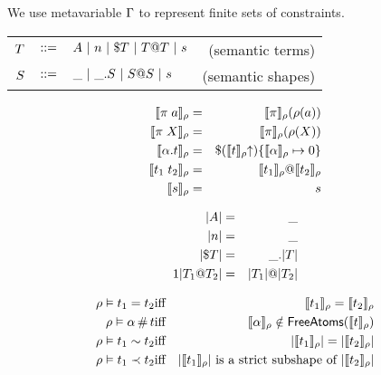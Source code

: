 \documentclass[english, mgr]{iithesis}
\begin{document}
We use metavariable $\Gamma$ to represent finite sets of constraints.


\begin{tabular}{rclr}
$T$ & $::=$ & $A
               \ |\  n
               \ |\  \$ T
               \ |\  T @ T
               \ |\  s$
    & (semantic terms) \\
$S$   & $::=$ & $\_
               \ |\  \_. S
               \ |\  S @ S
               \ |\  s$
    & (semantic shapes)
\end{tabular}

\begin{eqnarray*}
  \llbracket \pi \; a \rrbracket_{\rho} & = &
    \llbracket \pi \rrbracket_{\rho}(\rho(a)) \\
  \llbracket \pi \; X \rrbracket_{\rho} & = &
    \llbracket \pi \rrbracket_{\rho}(\rho(X)) \\
  \llbracket \alpha. t \rrbracket_{\rho} & = &
    \$ (\llbracket t \rrbracket_{\rho} \kern-3pt \uparrow)
      \{\llbracket \alpha \rrbracket_{\rho}\mapsto0\} \\
  \llbracket t_1 \; t_2 \rrbracket_{\rho} & = &
    \llbracket t_1 \rrbracket_{\rho} @ \llbracket t_2 \rrbracket_{\rho} \\
  \llbracket s \rrbracket_{\rho} & = & s
\end{eqnarray*}

\begin{eqnarray*}
  |A|                     & = & \_ \\
  |n|                            & = & \_ \\
  |\$ T|             & = & \_. |T| \\1
  |T_1 @ T_2| & = &
    |T_1| @ |T_2|
\end{eqnarray*}

\begin{eqnarray*}
  \rho \vDash t_1 = t_2 & \textrm{iff} &
    \llbracket t_1 \rrbracket_{\rho} = \llbracket t_2 \rrbracket_{\rho} \\
  \rho \vDash \alpha \,\#\, t & \textrm{iff} &
    \llbracket \alpha \rrbracket_{\rho} \notin
      \mathsf{FreeAtoms}(\llbracket t \rrbracket_{\rho}) \\
  \rho \vDash t_1 \sim t_2 & \textrm{iff} &
    |\llbracket t_1 \rrbracket_{\rho}| = |\llbracket t_2 \rrbracket_{\rho}| \\
  \rho \vDash t_1 \prec t_2 & \textrm{iff} &
    |\llbracket t_1 \rrbracket_{\rho}| \textrm{ is a strict subshape of }
      |\llbracket t_2 \rrbracket_{\rho}|
\end{eqnarray*}
\end{document}
